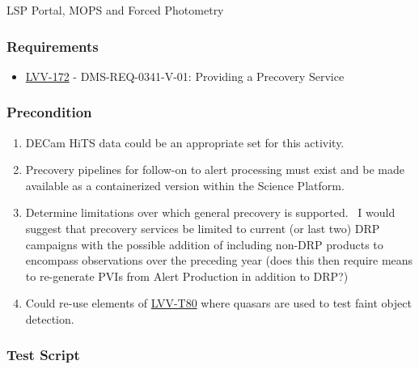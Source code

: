 LSP Portal, MOPS and Forced Photometry~

\hypertarget{requirements-137}{%
\subsubsection{Requirements}\label{requirements-137}}

\begin{itemize}
\tightlist
\item
  \href{https://jira.lsstcorp.org/browse/LVV-172}{LVV-172} -
  DMS-REQ-0341-V-01: Providing a Precovery Service
\end{itemize}

\hypertarget{precondition-18}{%
\subsubsection{Precondition}\label{precondition-18}}

\begin{enumerate}
\tightlist
\item
  DECam HiTS data could be an appropriate set for this activity.
\item
  Precovery pipelines for follow-on to alert processing must exist and
  be made available as a containerized version within the Science
  Platform.
\item
  Determine limitations over which general precovery is supported. ~I
  would suggest that precovery services be limited to current (or last
  two) DRP campaigns with the possible addition of including non-DRP
  products to encompass observations over the preceding year (does this
  then require means to re-generate PVIs from Alert Production in
  addition to DRP?)
\item
  Could re-use elements of
  \href{https://jira.lsstcorp.org/secure/Tests.jspa\#/testCase/LVV-T80}{LVV-T80}
  where quasars are used to test faint object detection.
\end{enumerate}

\hypertarget{test-script-137}{%
\subsubsection{Test Script}\label{test-script-137}}

